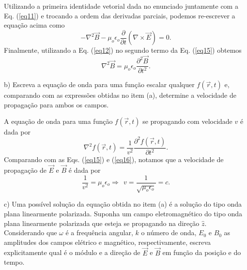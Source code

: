 \begin{enumerate}[start=1,label={\bfseries Q\arabic*.}]
\begin{equation}
\end{equation}
%
Utilizando a primeira identidade vetorial dada no enunciado juntamente com a Eq. (\ref{eq11}) e trocando a ordem das derivadas parciais, podemos re-escrever a equação acima como
%
\begin{equation}\label{eq15}
  - \nabla^{2} \vec{B} - \mu_{o} \epsilon_{o} \frac{\partial}{\partial t} (\nabla \times \vec{E}) = 0 .
\end{equation}
%
Finalmente, utilizando a Eq. (\ref{eq12}) no segundo termo da Eq. (\ref{eq15}) obtemos
%
\begin{equation}
  \nabla^{2} \vec{B} = \mu_{o} \epsilon_{o} \frac{\partial^{2} \vec{B}}{\partial t^{2}} .
\end{equation}
%


b) Escreva a equação de onda para uma função escalar qualquer $f(\vec{r},t)$ e, comparando com as expressões obtidas no item (a), determine a velocidade de propagação para ambos os campos.

\resposta A equação de onda para uma função $f(\vec{r},t)$ se propagando com velocidade $v$ é dada por
%
\begin{equation}\label{eq16}
  \nabla^{2} f (\vec{r},t) = \frac{1}{v^{2}} \frac{\partial^{2} f (\vec{r},t) }{\partial t^{2}} .
\end{equation}
%
Comparando com as Eqs. (\ref{eq15}) e (\ref{eq16}), notamos que a velocidade de propagação de $\vec{E}$ e $\vec{B}$ é dada por
%
\begin{equation}\label{eq17}
  \frac{1}{v^{2}} = \mu_{o} \epsilon_{o} \Rightarrow \ \  v  = \frac{1}{\sqrt{\mu_{o} \epsilon_{o} }} = c.
\end{equation}
%



c) Uma possível solução da equação obtida no item (a) é a solução do tipo onda plana linearmente polarizada. Suponha um campo eletromagnético do tipo onda plana linearmente polarizada que esteja se propagando na direção $\hat{z}$. Considerando que $\omega$ é a frequência angular, $k$ o número de onda, $E_{0}$ e $B_{0}$ as amplitudes dos campos elétrico e magnético, respectivamente, escreva explicitamente qual é o módulo e a direção de $\vec{E}$ e $\vec{B}$ em função da posição e do tempo.


\end{enumerate}
